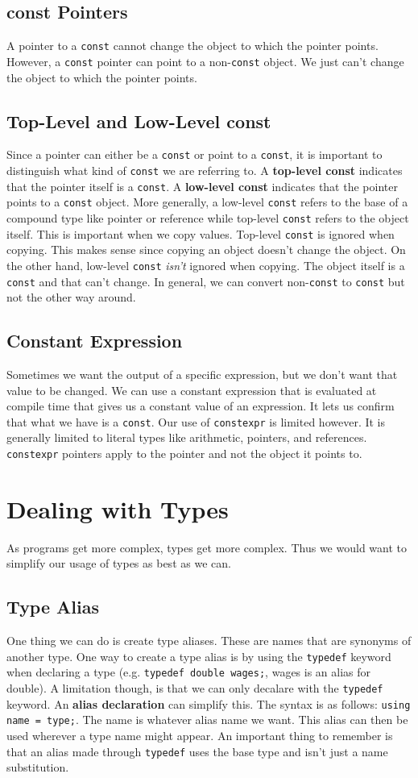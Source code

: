 \documentclass[12pt, a4paper]{report}
\begin{document}
\subsection{const Pointers}
A pointer to a \verb|const| cannot change the object to which the pointer points. However, a \verb|const| pointer can point to a non-\verb|const| object. We just can't change the object to which the pointer points.
\subsection{Top-Level and Low-Level const}
Since a pointer can either be a \verb|const| or point to a \verb|const|, it is important to distinguish what kind of \verb|const| we are referring to. A \textbf{top-level const} indicates that the pointer itself is a \verb|const|. A \textbf{low-level const} indicates that the pointer points to a \verb|const| object. More generally, a low-level \verb|const| refers to the base of a compound type like pointer or reference while top-level \verb|const| refers to the object itself.
This is important when we copy values. Top-level \verb|const| is ignored when copying. This makes sense since copying an object doesn't change the object. On the other hand, low-level \verb|const| \emph{isn't} ignored when copying. The object itself is a \verb|const| and that can't change.
\newline In general, we can convert non-\verb|const| to \verb|const| but not the other way around.
\subsection{Constant Expression}
Sometimes we want the output of a specific expression, but we don't want that value to be changed. We can use a constant expression that is evaluated at compile time that gives us a constant value of an expression. It lets us confirm that what we have is a \verb|const|. Our use of \verb|constexpr| is limited however. It is generally limited to literal types like arithmetic, pointers, and references. \verb|constexpr| pointers apply to the pointer and not the object it points to.
\section{Dealing with Types}
As programs get more complex, types get more complex. Thus we would want to simplify our usage of types as best as we can. 
\subsection{Type Alias}
One thing we can do is create type aliases. These are names that are synonyms of another type. One way to create a type alias is by using the \verb|typedef| keyword when declaring a type (e.g. \verb|typedef double wages;|, wages is an alias for double). A limitation though, is that we can only decalare with the \verb|typedef| keyword.
An \textbf{alias declaration} can simplify this. The syntax is as follows: \verb|using name = type;|. The name is whatever alias name we want. This alias can then be used wherever a type name might appear. An important thing to remember is that an alias made through \verb|typedef| uses the base type and isn't just a name substitution.
\end{document}
